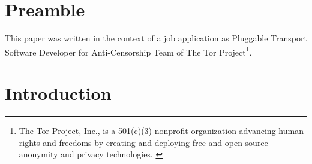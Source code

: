 \documentclass[sigconf, screen]{acmart}
\begin{document}
\maketitle

\section*{Preamble}
\label{s:preamble}
This paper was written in the context of a job application as Pluggable Transport Software Developer for Anti-Censorship Team of The Tor Project\footnote{The Tor Project, Inc., is a 501(c)(3) nonprofit organization advancing human rights and freedoms by creating and deploying free and open source anonymity and privacy technologies. \cite{JobDes}}.
\section{Introduction}
\label{s:introduction}
\end{document}
